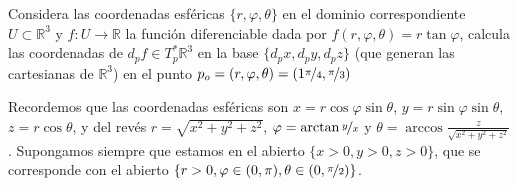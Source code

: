 \begin{ejer}
    [2.23] Considera las coordenadas esf\'ericas $\{r,\varphi, \theta\}$ en el dominio correspondiente $U \subset \mathbb R^3$ y $f : U \longrightarrow \mathbb R$ la funci\'on diferenciable dada por $f(r,\varphi, \theta)=r\tan \varphi$, calcula las coordenadas de $d_pf \in T_p^*\mathbb R^3$ en la base $\{d_px,d_py,d_pz\}$ (que generan las cartesianas de $\mathbb R^3$) en el punto $p_o = (r, \varphi, \theta)=(1\nicefrac{\pi}{4}, \nicefrac{\pi}{3})$ 
\end{ejer}
\begin{sol}
    Recordemos que las coordenadas esf\'ericas son $x=r \cos  \varphi\sin \theta$, $y =r\sin \varphi\sin \theta$, $z=r \cos  \theta$, y del rev\'es $r=\sqrt{x^2+y^2+z^2}$, $\varphi=\arctan \nicefrac{y}{x}$ y $\theta = \arccos  \frac{z}{\sqrt{x^2+y^2+z^2}}$. Supongamos siempre que estamos en el abierto $\{x>0,y>0,z>0\}$, que se corresponde con el abierto $\{r>0, \varphi \in(0,\pi), \theta \in (0, \nicefrac{\pi}{2})\}$.


\end{sol}
